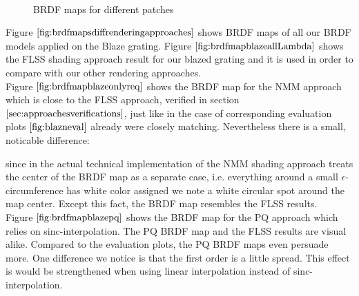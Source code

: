 \begin{figure}[H]
  \centering
~
~

\caption[BRDF Map FLSS of our Gratings]{BRDF maps for different patches}
\label{fig:brdfmapsdiffpatches}
\end{figure}


Figure $\ref{fig:brdfmapsdiffrenderingapproaches}$ shows BRDF maps of all our BRDF models applied on the Blaze grating. Figure $\ref{fig:brdfmapblazeallLambda}$ shows the FLSS shading approach result for our blazed grating and it is used in order to compare with our other rendering approaches. \\

Figure $\ref{fig:brdfmapblazeonlyreq}$ shows the BRDF map for the NMM approach which is close to the FLSS approach, verified in section $\ref{sec:approachesverifications}$, just like in the case of corresponding evaluation plots $\ref{fig:blazneval}$ already were closely matching. Nevertheless there is a small, noticable difference: 

since in the actual technical implementation of the NMM shading approach treats the center of the BRDF map as a separate case, i.e. everything around a small $\epsilon$-circumference has white color assigned we note a white circular spot around the map center. Except this fact, the BRDF map resembles the FLSS results. \\

Figure $\ref{fig:brdfmapblazepq}$ shows the BRDF map for the PQ approach which relies on sinc-interpolation. The PQ BRDF map and the FLSS results are visual alike. Compared to the evaluation plots, the PQ BRDF maps even persuade more. One difference we notice is that the first order is a little spread. This effect is would be strengthened when using linear interpolation instead of sinc-interpolation. \\

